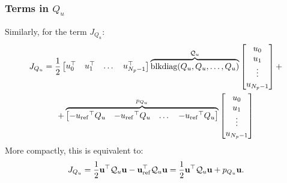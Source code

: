 \documentclass[a4paper,12pt,fleqn]{article}
\newcommand{\varuvec}{\mathbf{u}}
\newcommand{\Np}{{N_p}}
\newcommand{\blkdiag}{\text{blkdiag}}
\begin{document}
 \subsubsection{Terms in $Q_u$}
 Similarly, for the term $J_{Q_u}$: 
\begin{multline}
\label{eq:J_Qu}
 J_{Q_u} = \frac{1}{2}
 \begin{bmatrix}
  u_0^\top & u_1^\top &\dots & u_{\Np-1}^\top
 \end{bmatrix}
 \overbrace{\blkdiag(Q_u, Q_u, \dots, Q_u)}^{\mathcal{Q}_u}
 \begin{bmatrix}
  u_0 \\  u_1\\ \vdots\\  u_{\Np-1}
 \end{bmatrix}
  + \\
 +
 \overbrace{
  \begin{bmatrix}
  -{u_{\rm ref}}^\top Q_u & -{u_{\rm ref}}^\top Q_u &\dots & -{u_{\rm ref}}^\top Q_u
 \end{bmatrix}
 }^{p_{Q_u}}
 \begin{bmatrix}
  u_0 \\ u_1 \\ \vdots \\ u_{\Np-1}
 \end{bmatrix} 
 \end{multline}
 More compactly, this is equivalent to:
 \begin{equation}
  J_{Q_u} = \frac{1}{2} \varuvec^\top \mathcal{Q}_u \varuvec - \varuvec_{\rm ref}^\top \mathcal{Q}_u
 \varuvec = \frac{1}{2} \varuvec^\top \mathcal{Q}_u \varuvec + p_{Q_u}
 \varuvec 
 .
 \end{equation}
\end{document}
